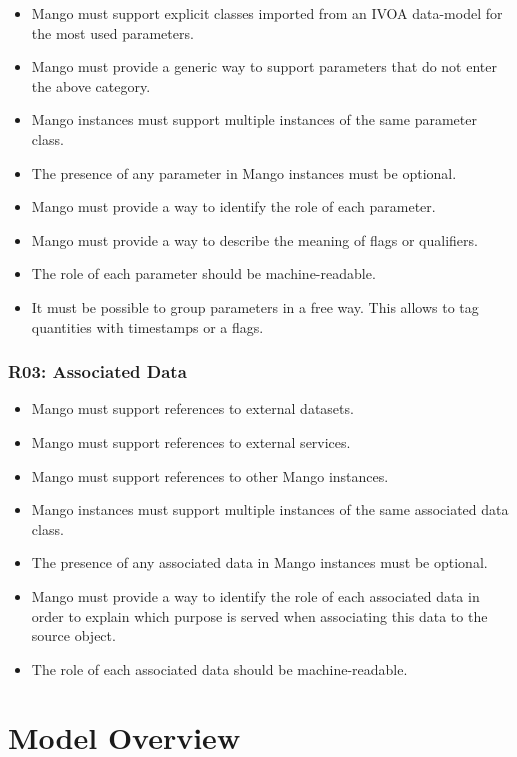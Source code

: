 \documentclass[11pt,a4paper]{ivoa}
\begin{document}
\begin{itemize}
    \item Mango must support explicit classes imported from an IVOA data-model for the most used parameters.
    \item Mango must provide a generic way to support parameters that do not enter the above category.
    \item Mango instances must support multiple instances of the same parameter class.
    \item The presence of any parameter in Mango instances must be optional.
    \item Mango must provide a way to identify the role of each parameter.
    \item  Mango must provide a way to describe the meaning of flags or qualifiers.
    \item The role of each parameter should be machine-readable.
    \item It must be possible to group parameters in a free way.
          This allows to tag quantities with timestamps or a flags.
\end{itemize}

\subsubsection{R03: Associated Data}

\begin{itemize}
    \item Mango must support references to external datasets.
    \item Mango must support references to external services.
    \item Mango must support references to other Mango instances.
    \item Mango instances must support multiple instances of the same associated data class.
    \item The presence of any associated data in Mango instances must be optional.
    \item Mango must provide a way to identify the role of each associated data in
          order to explain which purpose is served when associating this data to the source object.
    \item The role of each associated data should be machine-readable.
 \end{itemize}

\section{Model Overview}
\end{document}
